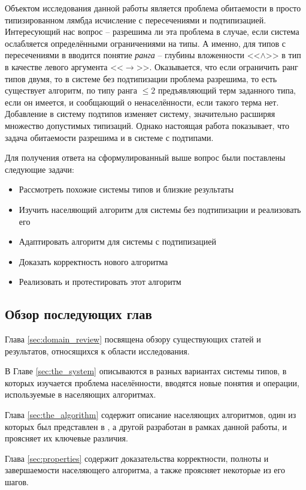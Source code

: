 \documentclass[../main.tex]{subfiles}
\begin{document}
\emptyline

Объектом исследования данной работы является проблема обитаемости в просто типизированном лямбда исчисление с пересечениями и подтипизацией. Интересующий нас вопрос -- разрешима ли эта проблема в случае, если система ослабляется определёнными ограничениями на типы. А именно, для типов с пересечениями в \cite{leivant_1983} вводится понятие {\it ранга} -- глубины вложенности <<$\wedge$>> в тип в качестве левого аргумента <<$\to$>>. Оказывается, что если ограничить ранг типов двумя, то в системе без подтипизации проблема разрешима, то есть существует алгоритм, по типу ранга $\leqslant 2$ предъявляющий терм заданного типа, если он имеется, и сообщающий о ненаселённости, если такого терма нет. Добавление в систему подтипов изменяет систему, значительно расширяя множество допустимых типизаций. Однако настоящая работа показывает, что задача обитаемости разрешима и в системе с подтипами.

Для получения ответа на сформулированный выше вопрос были поставлены следующие задачи: 
\begin{itemize}
    \item Рассмотреть похожие системы типов и близкие результаты
    \item Изучить населяющий алгоритм для системы без подтипизации и реализовать его
    \item Адаптировать алгоритм для системы с подтипизацией
    \item Доказать корректность нового алгоритма
    \item Реализовать и протестировать этот алгоритм
    
\end{itemize}

\subsection*{Обзор последующих глав}
Глава \ref{sec:domain_review} посвящена обзору существующих статей и результатов, относящихся к области исследования. 

В Главе \ref{sec:the_system} описываются в разных вариантах системы типов, в которых изучается проблема населённости, вводятся новые понятия и операции, используемые в населяющих алгоритмах.

Глава \ref{sec:the_algorithm} содержит описание населяющих алгоритмов, один из которых был представлен в \cite{kusmierek_2007}, а другой разработан в рамках данной работы, и проясняет их ключевые различия.

Глава \ref{sec:properties} содержит доказательства корректности, полноты и завершаемости населяющего алгоритма, а также проясняет некоторые из его шагов. 
\end{document}
